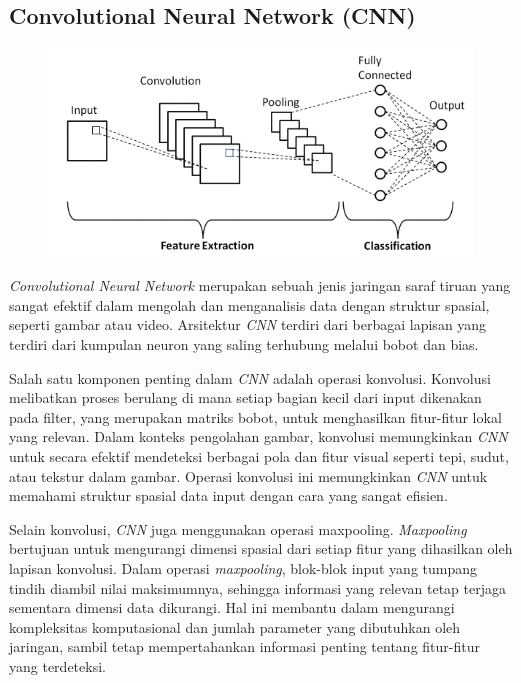 \subsection{Convolutional Neural Network (CNN)}
\begin{figure} [ht] \centering
  \includegraphics[scale=0.7]{gambar/bener/ArsitekturCNNSederhana.png}
  \label{fig:Arsitektur Umum Convolutional Neural Network}
\end{figure}
\textit{Convolutional Neural Network} merupakan sebuah jenis jaringan saraf tiruan yang sangat efektif dalam mengolah dan menganalisis data dengan struktur spasial, seperti gambar atau video. Arsitektur \textit{CNN} terdiri dari berbagai lapisan yang terdiri dari kumpulan neuron yang saling terhubung melalui bobot dan bias. \cite{wu2017introduction}

Salah satu komponen penting dalam \textit{CNN} adalah operasi konvolusi. Konvolusi melibatkan proses berulang di mana setiap bagian kecil dari input dikenakan pada filter, yang merupakan matriks bobot, untuk menghasilkan fitur-fitur lokal yang relevan. Dalam konteks pengolahan gambar, konvolusi memungkinkan \textit{CNN} untuk secara efektif mendeteksi berbagai pola dan fitur visual seperti tepi, sudut, atau tekstur dalam gambar. Operasi konvolusi ini memungkinkan \textit{CNN} untuk memahami struktur spasial data input dengan cara yang sangat efisien.\cite{koushik2016understanding}

Selain konvolusi, \textit{CNN} juga menggunakan operasi maxpooling. \textit{Maxpooling} bertujuan untuk mengurangi dimensi spasial dari setiap fitur yang dihasilkan oleh lapisan konvolusi. Dalam operasi \textit{maxpooling}, blok-blok input yang tumpang tindih diambil nilai maksimumnya, sehingga informasi yang relevan tetap terjaga sementara dimensi data dikurangi. Hal ini membantu dalam mengurangi kompleksitas komputasional dan jumlah parameter yang dibutuhkan oleh jaringan, sambil tetap mempertahankan informasi penting tentang fitur-fitur yang terdeteksi.

